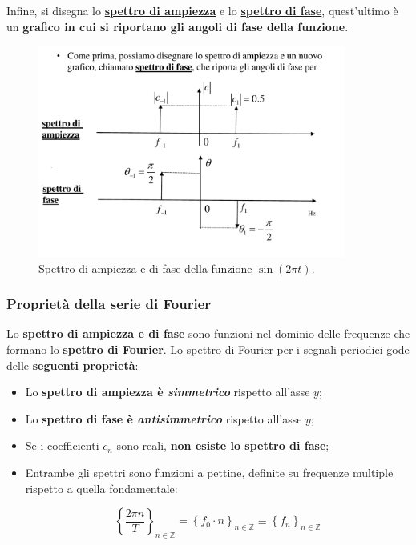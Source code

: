 \documentclass[a4paper]{article}
\begin{document}
	\noindent
	Infine, si disegna lo \textbf{\underline{spettro di ampiezza}} e lo \textbf{\underline{spettro di fase}}, quest'ultimo è un \textbf{grafico in cui si riportano gli angoli di fase della funzione}.
	
	\begin{figure}[!htp]
		\centering
		\includegraphics[width=0.9\textwidth]{img/fourier_spettro_di_ampiezza-e-fase.pdf}
		\caption{Spettro di ampiezza e di fase della funzione $\sin\left(2 \pi t\right)$.}
	\end{figure}

	\newpage
	
	\subsubsection{Proprietà della serie di Fourier}
	
	\noindent
	Lo \textbf{spettro di ampiezza e di fase} sono funzioni nel dominio delle frequenze che formano lo {\underline{\textcolor{Red3}{\textbf{spettro di Fourier}}}}. Lo spettro di Fourier per i segnali periodici gode delle \textbf{seguenti \underline{proprietà}}:
	
	\begin{itemize}
		\item Lo \textbf{spettro di ampiezza è \emph{simmetrico}} rispetto all'asse $y$;
		
		\item Lo \textbf{spettro di fase è \emph{antisimmetrico}} rispetto all'asse $y$;
		
		\item Se i coefficienti $c_{n}$ sono reali, \textbf{non esiste lo spettro di fase};
		
		\item Entrambe gli spettri sono funzioni a pettine\label{funzioni a pettine}, definite su frequenze multiple rispetto a quella fondamentale:
		
		\begin{equation*}
			\left\{\dfrac{2 \pi n}{T}\right\}_{n \in \mathbb{Z}} = \left\{f_{0} \cdot n\right\}_{n \in \mathbb{Z}} \equiv \left\{f_{n}\right\}_{n \in \mathbb{Z}}
		\end{equation*}
	\end{itemize}
\end{document}
